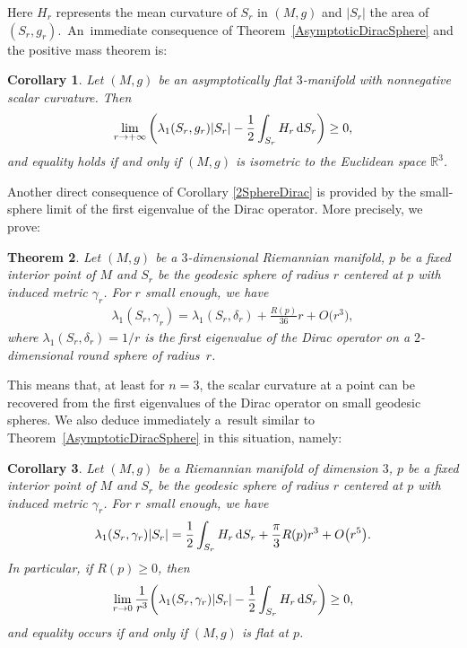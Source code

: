 \documentclass[10pt,a4paper]{amsart}
\numberwithin{equation}{section}
\newtheorem{Theorem}{Theorem}[section]
\newtheorem{Corollary}[Theorem]{Corollary}
\begin{document}
Here $H_r$ represents the mean curvature of $S_r$ in $(M,g)$ and $|S_r|$ the area of $(S_r,g_r)$.\ An~im\-me\-di\-ate consequence of Theorem~\ref{AsymptoticDiracSphere} and the positive mass theorem is:

\begin{Corollary}%
Let $(M,g)$ be an asymptotically flat $3$-manifold with nonnegative scalar curvature. Then
\begin{gather*}
\lim_{r\rightarrow+\infty}\bigg(\lambda_1(S_r,g_r)|S_r|-\frac{1}{2}\int_{S_r} H_r\,{\rm d}S_{r}\bigg)\geq 0,
\end{gather*}
and equality holds if and only if $(M,g)$ is isometric to the Euclidean space $\mathbb{R}^3$.
\end{Corollary}

Another direct consequence of Corollary \ref{2SphereDirac} is provided by the small-sphere limit of the first eigenvalue of the Dirac operator. More precisely, we prove:

\begin{Theorem}\label{SmallSphereExpansion}
Let $(M,g)$ be a $3$-dimensional Riemannian manifold, $p$ be a fixed interior point of $M$ and $S_r$ be the geodesic sphere of radius $r$ centered at $p$ with induced metric $\gamma_r$. For $r$ small enough, we have
\begin{gather*}%
\lambda_1(S_r,\gamma_r)=\lambda_1(S_r,\delta_r)+\frac{R(p)}{36}r+O\big(r^3\big),
\end{gather*}
where $\lambda_1(S_r,\delta_r)=1/r$ is the first eigenvalue of the Dirac operator on a $2$-dimensional round sphere of radius~$r$.
\end{Theorem}

This means that, at least for $n=3$, the scalar curvature at a point can be recovered from the first eigenvalues of the Dirac operator on small geodesic spheres. We also deduce immediately a~result similar to Theorem~\ref{AsymptoticDiracSphere} in this situation, namely:

\begin{Corollary}\label{SmallSphereDiracV}
Let $(M,g)$ be a Riemannian manifold of dimension $3$, $p$ be a fixed interior point of $M$ and $S_r$ be the geodesic sphere of radius $r$ centered at $p$ with induced metric $\gamma_r$. For $r$ small enough, we have
\begin{gather*}%
\lambda_1(S_r,\gamma_r)|S_r|=\frac{1}{2}\int_{S_r} H_r\,{\rm d}S_{r}+\frac{\pi}{3}R(p)r^3+O\big(r^5\big).
\end{gather*}
In particular, if $R(p)\geq 0$, then
\begin{gather*}
\lim_{r\rightarrow 0}\frac{1}{r^3}\bigg(\lambda_1(S_r,\gamma_r)|S_r|-\frac{1}{2}\int_{S_r} H_r\,{\rm d}S_{r}\bigg)\geq 0,
\end{gather*}
and equality occurs if and only if $(M,g)$ is flat at $p$.
\end{Corollary}
\end{document}
